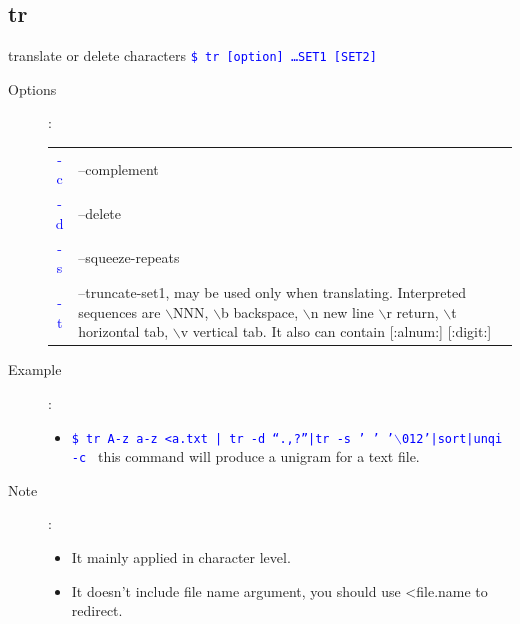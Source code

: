 \documentclass[a4paper,12pt,twoside]{book}
\newcommand{\linuxcommand}[1]{\texttt{\textcolor{blue}{\$ #1 \Pisymbol{psy}{191}}}}
\newcommand{\op}[1]{\textcolor{blue}{-#1}}
\begin{document}
\begin{CJK*}{UTF8}{song}
\section{tr}
	translate or delete characters
	\linuxcommand{tr [option] \ldots SET1 [SET2]}
	\begin{description}
	\item[Options]: \\
		\begin{tabular}{c|p{}}
		\hline
		\op{c} & --complement \\
		\op{d} & --delete\\
		\op{s} & --squeeze-repeats\\
		\op{t} & --truncate-set1, may be used only when translating.
		Interpreted sequences are $\backslash$NNN, $\backslash$b backspace, $\backslash$n new line $\backslash$r return, $\backslash$t horizontal tab, $\backslash$v vertical tab. It also can contain [:alnum:] [:digit:] \\
		\hline
		\end{tabular}
	\item[Example]:
		\begin{itemize}
		\item \linuxcommand{tr A-z a-z <a.txt | tr -d ``.,?''|tr -s ' ' '$\backslash$012'|sort|unqi -c} this command will
		produce a unigram for a text file.
		\end{itemize}
	\item[Note]:
		\begin{itemize}
		\item It mainly applied in character level.
		\item It doesn't include file name argument, you should use <file.name to redirect.
		\end{itemize}
	\end{description}

\end{CJK*}
\end{document}
